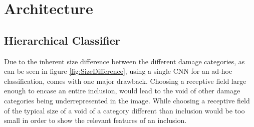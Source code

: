 \chapter{Architecture}

\label{cha:Architecture}

\section{Hierarchical Classifier}
Due to the inherent size difference between the different damage categories, as can be seen in figure \ref{fig:SizeDifference}, using a single CNN for an ad-hoc classification, comes with one major drawback. Choosing a receptive field large enough to encase an entire inclusion, would lead to the void of other damage categories being underrepresented in the image. While choosing a receptive field of the typical size of a void of a category different than inclusion would be too small in order to show the relevant features of an inclusion.\\

